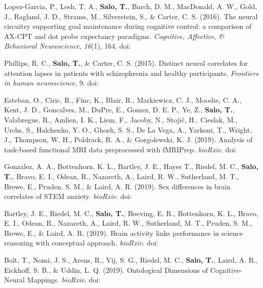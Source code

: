 \documentclass[10pt]{article}
\newcommand{\sectionstyle}{\LARGE \fontfamily{lmr}\selectfont}
\newcommand{\textlink}[3][blue]{\href{#2}{\color{#1}{#3}}}
\begin{document}
\begin{hangparas}{.25in}{1}
	\bigskip

	Lopez-Garcia, P., Lesh, T. A., \textbf{Salo, T.}, Barch, D. M., MacDonald,
	A. W., Gold, J., Ragland, J. D., Strauss, M., Silverstein, S., \& Carter, C. S.
	(2016). The neural circuitry supporting goal maintenance during cognitive
	control: a comparison of AX-CPT and dot probe expectancy paradigms.
	\emph{Cognitive, Affective, \& Behavioral Neuroscience}, \emph{16}(1), 164.
	doi:\textlink{https://doi.org/10.3758/s13415-015-0384-1}{10.3758/s13415-015-0384-1}

	\bigskip

	Phillips, R. C., \textbf{Salo, T.}, \& Carter, C. S. (2015). Distinct neural
	correlates for attention lapses in patients with schizophrenia and healthy
	participants. \emph{Frontiers in human neuroscience}, 9.
	doi:\textlink{https://doi.org/10.3389/fnhum.2015.00502}{10.3389/fnhum.2015.00502}

\end{hangparas}

\bigskip

\begin{center}\sectionstyle{PREPRINTS}\end{center}

\begin{hangparas}{.25in}{1}

	Esteban, O., Ciric, R., Finc, K., Blair, R., Markiewicz, C. J.,
	Moodie, C. A., Kent, J. D., Goncalves, M., DuPre, E., Gomez, D. E. P.,
	Ye, Z., \textbf{Salo, T.}, Valabregue, R., Amlien, I. K., Liem, F.,
	Jacoby, N., Stojić, H., Cieslak, M., Urchs, S., Halchenko, Y. O.,
	Ghosh, S. S., De La Vega, A., Yarkoni, T., Wright, J., Thompson, W. H.,
	Poldrack, R. A., \& Gorgolewski, K. J. (2019).
	Analysis of task-based functional MRI data preprocessed with fMRIPrep.
	\emph{bioRxiv}.
 	doi:\textlink{https://doi.org/10.1101/694364}{10.1101/694364}

	\bigskip

	Gonzalez, A. A., Bottenhorn, K. L., Bartley, J. E., Hayes T., Riedel, M. C.,
	\textbf{Salo, T.}, Bravo, E. I., Odean, R., Nazareth, A., Laird, R. W.,
	Sutherland, M. T., Brewe, E., Pruden, S. M., \& Laird, A. R. (2019).
	Sex differences in brain correlates of STEM anxiety. \emph{bioRxiv}.
	doi:\textlink{https://doi.org/10.1101/528075}{10.1101/528075}

	\bigskip

	Bartley, J. E., Riedel, M. C., \textbf{Salo, T.}, Boeving, E. R.,
	Bottenhorn, K. L., Bravo, E. I., Odean, R., Nazareth, A., Laird, R. W.,
	Sutherland, M. T., Pruden, S. M., Brewe, E., \& Laird, A. R. (2019).
	Brain activity links performance in science reasoning with conceptual
	approach. \emph{bioRxiv}.
	doi:\textlink{https://doi.org/10.1101/526574}{10.1101/526574}

	\bigskip

	Bolt, T., Nomi, J. S., Arens, R., Vij, S. G., Riedel, M. C.,
	\textbf{Salo, T.}, Laird, A. R., Eickhoff, S. B., \& Uddin, L. Q. (2019).
	Ontological Dimensions of Cognitive-Neural Mappings. \emph{bioRxiv}.
	doi:\textlink{https://doi.org/10.1101/524520}{10.1101/524520}

\end{hangparas}
\end{document}
